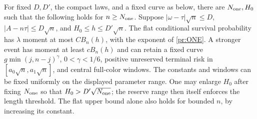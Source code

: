 \begin{proposition}\label{pr:gamma-one}
For fixed $D,D'$, the compact laws, and a fixed curve as below,
there are $N_{\rm one},H_0$
such that the following holds for $n\ge N_{\rm one}$.
Suppose $|\omega-\tau|\sqrt n\le D$, $|A-n\tau|\le D\sqrt n$, and
$H_0\le h\le D'\sqrt n$. The flat conditional survival probability has
$\lambda$ moment at most $C B_n(h)$, with the exponent of
\eqref{pr:ONE}. A stronger event has moment at least $c B_n(h)$ and can
retain a fixed curve $g\min(j,n-j)^\gamma$, $0<\gamma<1/6$, positive
unreserved terminal risk in $[a_0\sqrt n,a_1\sqrt n]$, and central
full-color windows. The constants and windows can be fixed uniformly
on the displayed parameter range.
One may enlarge $H_0$ after fixing $N_{\rm one}$ so that
$H_0>D'\sqrt{N_{\rm one}}$; the reserve range then itself enforces
the length threshold. The flat upper bound alone also holds for bounded
$n$, by increasing its constant.
\end{proposition}
